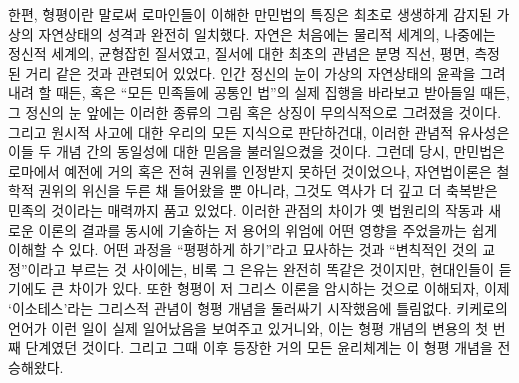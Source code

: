 한편, 형평이란 말로써 로마인들이 이해한 만민법의 특징은
최초로 생생하게 감지된 가상의 자연상태의 성격과 완전히 일치했다.
자연은 처음에는 물리적 세계의, 나중에는 정신적 세계의, 균형잡힌 질서였고,
질서에 대한 최초의 관념은 분명 직선, 평면, 측정된 거리 같은 것과
관련되어 있었다.
인간 정신의 눈이 가상의 자연상태의 윤곽을 그려내려 할 때든,
혹은 ``모든 민족들에 공통인 법''의 실제 집행을 바라보고 받아들일 때든,
그 정신의 눈 앞에는 이러한 종류의 그림 혹은 상징이 무의식적으로 그려졌을 것이다.
그리고 원시적 사고에 대한 우리의 모든 지식으로 판단하건대,
이러한 관념적 유사성은 이들 두 개념 간의 동일성에 대한 믿음을
불러일으켰을 것이다.
그런데 당시,
만민법은 로마에서 예전에 거의 혹은 전혀 권위를 인정받지 못하던 것이었으나,
자연법이론은 철학적 권위의 위신을 두른 채 들어왔을 뿐 아니라,
그것도 역사가 더 깊고 더 축복받은 민족의 것이라는 매력까지 품고 있었다.
이러한 관점의 차이가
옛 법원리의 작동과 새로운 이론의 결과를 동시에 기술하는 저 용어의 위엄에
어떤 영향을 주었을까는 쉽게 이해할 수 있다.
어떤 과정을 ``평평하게 하기''라고 묘사하는 것과
``변칙적인 것의 교정''이라고 부르는 것 사이에는,
비록 그 은유는 완전히 똑같은 것이지만, 현대인들이 듣기에도 큰 차이가 있다.
또한 형평이 저 그리스 이론을 암시하는 것으로 이해되자,
이제 `이소테스'라는 그리스적 관념이 형평 개념을 둘러싸기 시작했음에 틀림없다.
키케로의 언어가 이런 일이 실제 일어났음을 보여주고 있거니와,
이는 형평 개념의 변용의 첫 번째 단계였던 것이다.
그리고 그때 이후 등장한 거의 모든 윤리체계는 이 형평 개념을 전승해왔다.

